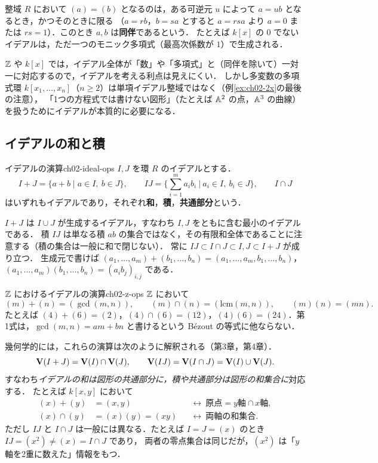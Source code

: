 整域 $R$ において $(a)=(b)$ となるのは，ある可逆元 $u$ によって $a=ub$ となるとき，かつそのときに限る
（$a=rb$，$b=sa$ とすると $a=rsa$ より $a=0$ または $rs=1$）．このとき $a,b$ は\textbf{同伴}であるという．
たとえば $k[x]$ の $0$ でないイデアルは，ただ一つのモニック多項式（最高次係数が $1$）で生成される．

$\mathbb{Z}$ や $k[x]$ では，イデアル全体が「数」や「多項式」と（同伴を除いて）一対一に対応するので，イデアルを考える利点は見えにくい．
しかし多変数の多項式環 $k[x_1,\dots,x_n]$（$n\ge2$）は単項イデアル整域ではなく（例\ref{ex:ch02-2x}の最後の注意），
「1つの方程式では書けない図形」（たとえば $\mathbb{A}^2$ の点，$\mathbb{A}^3$ の曲線）を扱うためにイデアルが本質的に必要になる．

\subsection{イデアルの和と積}

\begin{mydef}{イデアルの演算}{ch02-ideal-ops}
$I,J$ を環 $R$ のイデアルとする．
\[
  I+J=\{a+b\mid a\in I,\ b\in J\},\qquad IJ=\Big\{\sum_{i=1}^m a_ib_i\ \Big|\ a_i\in I,\ b_i\in J\Big\},\qquad I\cap J
\]
はいずれもイデアルであり，それぞれ\textbf{和}，\textbf{積}，\textbf{共通部分}という．
\end{mydef}

$I+J$ は $I\cup J$ が生成するイデアル，すなわち $I,J$ をともに含む最小のイデアルである．
積 $IJ$ は単なる積 $ab$ の集合ではなく，その有限和全体であることに注意する（積の集合は一般に和で閉じない）．
常に $IJ\subset I\cap J\subset I,J\subset I+J$ が成り立つ．
生成元で書けば $(a_1,\dots,a_m)+(b_1,\dots,b_n)=(a_1,\dots,a_m,b_1,\dots,b_n)$，$(a_1,\dots,a_m)(b_1,\dots,b_n)=(a_ib_j)_{i,j}$ である．

\begin{myex}{$\mathbb{Z}$ におけるイデアルの演算}{ch02-z-ops}
$\mathbb{Z}$ において
\[
  (m)+(n)=(\gcd(m,n)),\qquad (m)\cap(n)=(\mathrm{lcm}(m,n)),\qquad (m)(n)=(mn).
\]
たとえば $(4)+(6)=(2)$，$(4)\cap(6)=(12)$，$(4)(6)=(24)$．第1式は，$\gcd(m,n)=am+bn$ と書けるという Bézout の等式に他ならない．
\end{myex}

幾何学的には，これらの演算は次のように解釈される（第3章，第4章）．
\[
  \mathbf{V}(I+J)=\mathbf{V}(I)\cap\mathbf{V}(J),\qquad \mathbf{V}(IJ)=\mathbf{V}(I\cap J)=\mathbf{V}(I)\cup\mathbf{V}(J).
\]
すなわち\emph{イデアルの和は図形の共通部分に，積や共通部分は図形の和集合に}対応する．
たとえば $k[x,y]$ において
\[
  \begin{aligned}
  (x)+(y)&=(x,y) &&\leftrightarrow\ \text{原点}=\text{$y$軸}\cap\text{$x$軸},\\
  (x)\cap(y)&=(x)(y)=(xy) &&\leftrightarrow\ \text{両軸の和集合}.
  \end{aligned}
\]
ただし $IJ$ と $I\cap J$ は一般には異なる．たとえば $I=J=(x)$ のとき $IJ=(x^2)\ne(x)=I\cap J$ であり，
両者の零点集合は同じだが，$(x^2)$ は「$y$軸を2重に数えた」情報をもつ．

